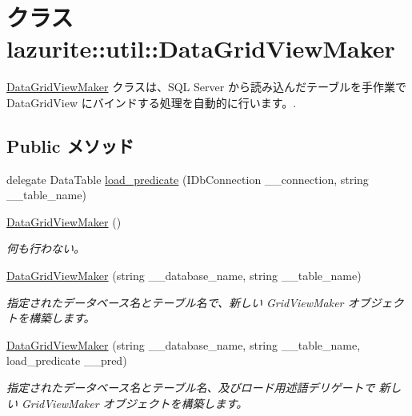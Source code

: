 \hypertarget{classlazurite_1_1util_1_1_data_grid_view_maker}{
\section{クラス lazurite::util::DataGridViewMaker}
\label{classlazurite_1_1util_1_1_data_grid_view_maker}
}


\hyperlink{classlazurite_1_1util_1_1_data_grid_view_maker}{DataGridViewMaker} クラスは、SQL Server から読み込んだテーブルを手作業で DataGridView にバインドする処理を自動的に行います。.  
\subsection*{Public メソッド}
\begin{DoxyCompactItemize}
\item 
delegate DataTable \hyperlink{classlazurite_1_1util_1_1_data_grid_view_maker_a7358a34bd5b5492d26254d29284cee7c}{load\_\-predicate} (IDbConnection \_\-\_\-connection, string \_\-\_\-table\_\-name)
\item 
\hyperlink{classlazurite_1_1util_1_1_data_grid_view_maker_a66d146863c2d9a0c5571809f11bb671e}{DataGridViewMaker} ()
\begin{DoxyCompactList}\small\item\em 何も行わない。 \item\end{DoxyCompactList}\item 
\hyperlink{classlazurite_1_1util_1_1_data_grid_view_maker_acbe3ddd315c9f36fc069106764af7d8f}{DataGridViewMaker} (string \_\-\_\-database\_\-name, string \_\-\_\-table\_\-name)
\begin{DoxyCompactList}\small\item\em 指定されたデータベース名とテーブル名で、新しい GridViewMaker オブジェクトを構築します。 \item\end{DoxyCompactList}\item 
\hyperlink{classlazurite_1_1util_1_1_data_grid_view_maker_a95ba94cf41919947c77711c03ddf972c}{DataGridViewMaker} (string \_\-\_\-database\_\-name, string \_\-\_\-table\_\-name, load\_\-predicate \_\-\_\-pred)
\begin{DoxyCompactList}\small\item\em 指定されたデータベース名とテーブル名、及びロード用述語デリゲートで 新しい GridViewMaker オブジェクトを構築します。 \item\end{DoxyCompactList}\item 

\end{DoxyCompactItemize}
